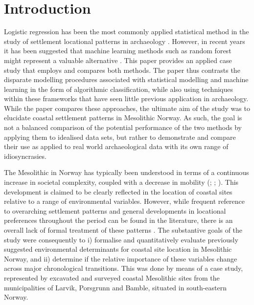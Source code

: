 \documentclass[12pt, a4paper]{article}
\begin{document}
\section{Introduction}
Logistic regression has been the most commonly applied statistical method in the study of settlement locational patterns in archaeology \citep[e.g.][]{kvamme1988, warren2000, woodman2002, verhagen2020}. However, in recent years it has been suggested that machine learning methods such as random forest might represent a valuable alternative \citep[e.g.][]{verhagen2012, harris2015}. This paper provides an applied case study that employs and compares both methods. The paper thus contrasts the disparate modelling procedures associated with statistical modelling and machine learning in the form of algorithmic classification, while also using techniques within these frameworks that have seen little previous application in archaeology. While the paper compares these approaches, the ultimate aim of the study was to elucidate coastal settlement patterns in Mesolithic Norway. As such, the goal is not a balanced comparison of the potential performance of the two methods by applying them to idealised data sets, but rather to demonstrate and compare their use as applied to real world archaeological data with its own range of idiosyncrasies.\par
The Mesolithic in Norway has typically been understood in terms of a continuous increase in societal complexity, coupled with a decrease in mobility (\citealp[e.g.][]{bergsvik2001}; \citealp{bjerck2008}; \citealp[97]{glorstad2010}). This development is claimed to be clearly reflected in the location of coastal sites relative to a range of environmental variables. However, while frequent reference to overarching settlement patterns and general developments in locational preferences throughout the period can be found in the literature, there is an overall lack of formal treatment of these patterns \citep{aastveit2014}. The substantive goals of the study were consequently to i) formalise and quantitatively evaluate previously suggested environmental determinants for coastal site location in Mesolithic Norway, and ii) determine if the relative importance of these variables change across major chronological transitions. This was done by means of a case study, represented by excavated and surveyed coastal Mesolithic sites from the municipalities of Larvik, Porsgrunn and Bamble, situated in south-eastern Norway. \par 
\end{document}
